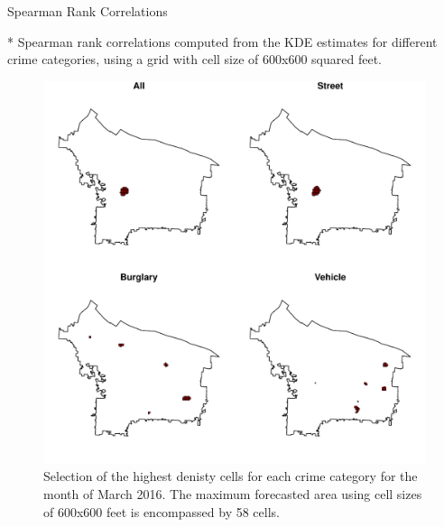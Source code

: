 \documentclass[12pt,letterpaper]{article}
\theoremstyle{plain}
\theoremstyle{plain}
\theoremstyle{definition}
\theoremstyle{remark}
\begin{document}
\begin{table}[h!]
    \centering
    \caption{Spearman Rank Correlations}
    \begin{threeparttable}
         
        \begin{tablenotes}\footnotesize
        \item[*] Spearman rank correlations computed from the KDE estimates for different crime categories, using a grid with cell size of 600x600 squared feet.
        \end{tablenotes}
    \end{threeparttable}
\end{table}

\begin{figure}[h!]
    \centering
    \includegraphics[]{figures/max_areas.pdf}
    \caption{Selection of the highest denisty cells for each crime category for the month of March 2016. The maximum forecasted area using cell sizes of 600x600 feet is encompassed by 58 cells.}
    \label{fig:figure1}
\end{figure}
\end{document}
